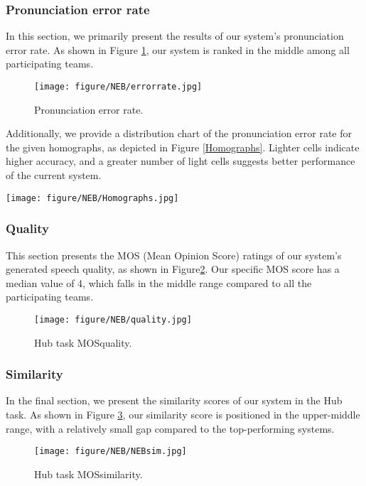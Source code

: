 \documentclass{INTERSPEECH2023}
\begin{document}
\subsubsection{Pronunciation error rate}
In this section, we primarily present the results of our system's pronunciation error rate. As shown in Figure \ref{error-rate}, our system is ranked in the middle among all participating teams. 

\begin{figure}[h]
  \texttt{[image: figure/NEB/errorrate.jpg]}
  \caption{Pronunciation error rate.}
  \label{error-rate}
\end{figure}

Additionally, we provide a distribution chart of the pronunciation error rate for the given homographs, as depicted in Figure \ref{Homographs}. Lighter cells indicate higher accuracy, and a greater number of light cells suggests better performance of the current system. 

\begin{figure*}[t]
  \centering
  \texttt{[image: figure/NEB/Homographs.jpg]}
  \caption{Per system and homograph.}
  \label{Homographs}
\end{figure*}

\subsubsection{Quality}
This section presents the MOS (Mean Opinion Score) ratings of our system's generated speech quality, as shown in Figure\ref{quality}. Our specific MOS score has a median value of 4, which falls in the middle range compared to all the participating teams. 

\begin{figure}[h]
  \centering
  \texttt{[image: figure/NEB/quality.jpg]}
  \caption{Hub task MOSquality.}
  \label{quality}
\end{figure}

\subsubsection{Similarity}
In the final section, we present the similarity scores of our system in the Hub task. As shown in Figure \ref{Similarity}, our similarity score is positioned in the upper-middle range, with a relatively small gap compared to the top-performing systems.

\begin{figure}[h]
  \centering
  \texttt{[image: figure/NEB/NEBsim.jpg]}
  \caption{Hub task MOSsimilarity.}
  \label{Similarity}
\end{figure}
\end{document}
